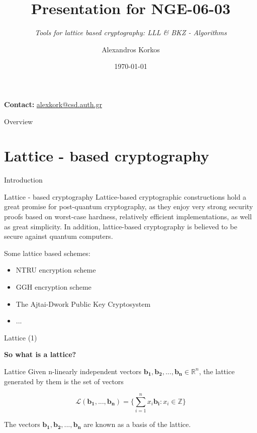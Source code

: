 \documentclass[aspectratio=169]{beamer}
\title{Presentation for NGE-06-03}
\subtitle{\emph{Tools for lattice based cryptography: LLL \& BKZ - Algorithms}}
\author{Alexandros Korkos}
\institute{Aristotle University of Thessaloniki \\ Computer Science Department}
\date{\today}
\begin{document}
    \begin{frame}
      \vfilll
      \titlepage
      \vfilll
       \textbf{Contact:} \href{mailto:alexkork@csd.auth.gr}{alexkork@csd.auth.gr}
    \end{frame}

    

    \begin{frame}{Overview}
        \tableofcontents[currentsection, hideothersubsections, sectionstyle=show/show]
    \end{frame}

    \section{Lattice - based cryptography}

    \begin{frame}{Introduction}
        \begin{block}{Lattice - based cryptography}
            Lattice-based cryptographic constructions hold a great promise for post-quantum cryptography, as they enjoy very strong security proofs based on worst-case hardness, relatively efficient implementations, as well as great simplicity. In addition, lattice-based cryptography is believed to be secure against quantum computers.
        \end{block}

        Some lattice based schemes:

        \begin{itemize} 
            \item NTRU encryption scheme
            \item GGH encryption scheme
            \item The Ajtai-Dwork Public Key Cryptosystem
            \item ...
        \end{itemize}
        
    \end{frame}

    \begin{frame}{Lattice (1)}
        \begin{center}
            \textbf{So what is a lattice?}
        \end{center}

        \begin{block}{Lattice}
            Given n-linearly independent vectors $\mathbf{b_1, b_2, ..., b_n} \in \mathbb{R}^n$, the lattice generated by them is the set of vectors

            \[
                \mathcal{L}(\mathbf{b_1, ..., b_n}) = \bigg\{ \sum_{i=1}^{n} x_i\mathbf{b_i}: x_i \in \mathbb{Z} \bigg\}
            \]

            The vectors $\mathbf{b_1, b_2, ..., b_n}$ are known as a basis of the lattice.
        \end{block}
    \end{frame}
\end{document}
